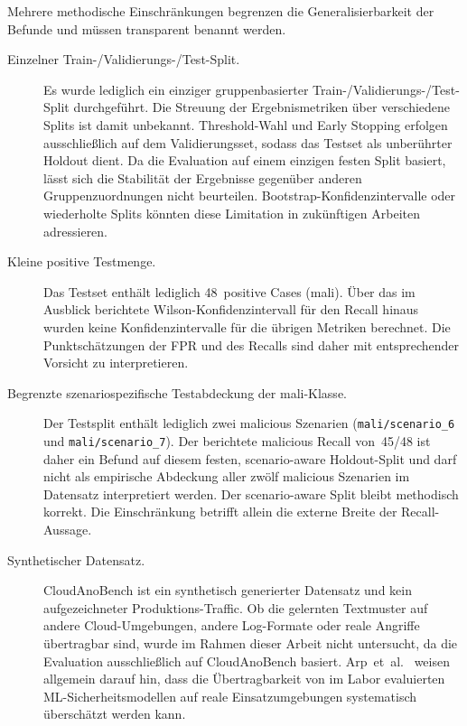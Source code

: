 Mehrere methodische Einschränkungen begrenzen die Generalisierbarkeit der Befunde und müssen transparent benannt werden.

\begin{description}
  \item[Einzelner Train-/Validierungs-/Test-Split.] Es wurde lediglich ein einziger gruppenbasierter Train-/Validierungs-/Test-Split durchgeführt. Die Streuung der Ergebnismetriken über verschiedene Splits ist damit unbekannt. Threshold-Wahl und Early Stopping erfolgen ausschließlich auf dem Validierungsset, sodass das Testset als unberührter Holdout dient. Da die Evaluation auf einem einzigen festen Split basiert, lässt sich die Stabilität der Ergebnisse gegenüber anderen Gruppenzuordnungen nicht beurteilen. Bootstrap-Konfidenzintervalle oder wiederholte Splits könnten diese Limitation in zukünftigen Arbeiten adressieren.

  \item[Kleine positive Testmenge.] Das Testset enthält lediglich 48~positive Cases (mali). Über das im Ausblick berichtete Wilson-Konfidenzintervall für den Recall hinaus wurden keine Konfidenzintervalle für die übrigen Metriken berechnet. Die Punktschätzungen der FPR und des Recalls sind daher mit entsprechender Vorsicht zu interpretieren.

  \item[Begrenzte szenariospezifische Testabdeckung der mali-Klasse.] Der Testsplit enthält lediglich zwei malicious Szenarien (\texttt{mali/scenario\_6} und \texttt{mali/scenario\_7}). Der berichtete malicious Recall von~45/48 ist daher ein Befund auf diesem festen, scenario-aware Holdout-Split und darf nicht als empirische Abdeckung aller zwölf malicious Szenarien im Datensatz interpretiert werden. Der scenario-aware Split bleibt methodisch korrekt. Die Einschränkung betrifft allein die externe Breite der Recall-Aussage.

  \item[Synthetischer Datensatz.] CloudAnoBench ist ein synthetisch generierter Datensatz und kein aufgezeichneter Produktions-Traffic. Ob die gelernten Textmuster auf andere Cloud-Umgebungen, andere Log-Formate oder reale Angriffe übertragbar sind, wurde im Rahmen dieser Arbeit nicht untersucht, da die Evaluation ausschließlich auf CloudAnoBench basiert. Arp~et~al.~\cite{arp2022dos} weisen allgemein darauf hin, dass die Übertragbarkeit von im Labor evaluierten ML-Sicherheitsmodellen auf reale Einsatzumgebungen systematisch überschätzt werden kann.


\end{description}
